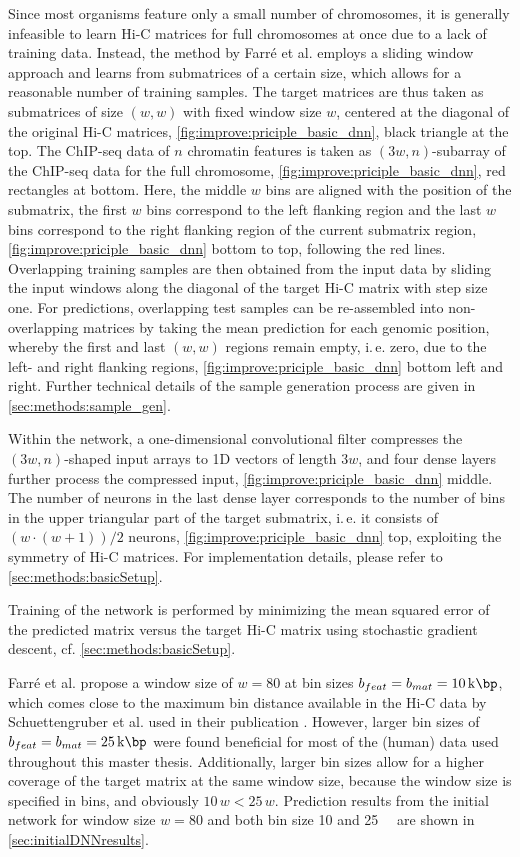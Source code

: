 Since most organisms feature only a small number of chromosomes, 
it is generally infeasible to learn Hi-C matrices for full chromosomes at once due to a lack of training data.
Instead, the method by Farr\'e et al. employs a sliding window approach and learns from submatrices of a certain size, 
which allows for a reasonable number of training samples.
The target matrices are thus taken as submatrices of size $(w, w)$ 
with fixed window size $w$, centered at the diagonal of the 
original Hi-C matrices, \cref{fig:improve:priciple_basic_dnn}, black triangle at the top.
The ChIP-seq data of $n$ chromatin features is taken as $(3w, n)$-subarray of the ChIP-seq data for the full chromosome, 
\cref{fig:improve:priciple_basic_dnn}, red rectangles at bottom. 
Here, the middle $w$ bins are aligned with the position of the submatrix,
the first $w$ bins correspond to the left flanking region and the last $w$ bins correspond to 
the right flanking region of the current submatrix region, \cref{fig:improve:priciple_basic_dnn} bottom to top, following the red lines. 
Overlapping training samples are then obtained from the input data by sliding 
the input windows along the diagonal of the target Hi-C matrix with step size one. 
For predictions, overlapping test samples can be re-assembled into non-overlapping matrices 
by taking the mean prediction for each genomic position, whereby the first and last $(w,w)$ regions remain
empty, i.\,e. zero, due to the left- and right flanking regions, \cref{fig:improve:priciple_basic_dnn} bottom left and right.
Further technical details of the sample generation process are given in \cref{sec:methods:sample_gen}.

Within the network, a one-dimensional convolutional filter compresses the $(3w, n)$-shaped input arrays to 1D vectors
of length $3w$, and four dense layers further process the compressed input, \cref{fig:improve:priciple_basic_dnn} middle.
The number of neurons in the last dense layer corresponds to the number of bins
in the upper triangular part of the target submatrix, i.\,e. it consists of $(w \cdot (w+1))/2$ neurons, \cref{fig:improve:priciple_basic_dnn} top, 
exploiting the symmetry of Hi-C matrices. 
For implementation details, please refer to \cref{sec:methods:basicSetup}.

Training of the network is performed by minimizing the mean squared error of the predicted matrix
versus the target Hi-C matrix using stochastic gradient descent, cf. \cref{sec:methods:basicSetup}.

Farr\'e et al. propose a window size of $w=80$ at bin sizes $b_{feat} = b_{mat} = \SI{10}{\kilo\bp}$,
which comes close to the maximum bin distance available in the Hi-C data by Schuettengruber et al. \cite{Schuettengruber2014} used in their publication \cite{Farre2018a}.
However, larger bin sizes of $b_{feat} = b_{mat} = \SI{25}{\kilo\bp}$ were found beneficial for 
most of the (human) data used throughout this master thesis.
Additionally, larger bin sizes allow for a higher coverage of the target matrix at the same window size,
because the window size is specified in bins, and obviously $10\, w < 25\, w$.
Prediction results from the initial network for window size $w=80$ and both bin size 10 and \SI{25}{\kilo\bp} are shown in \cref{sec:initialDNNresults}.

